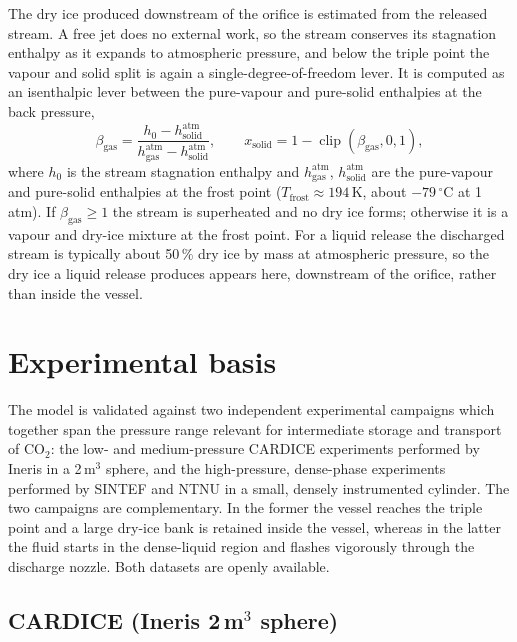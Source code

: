 \documentclass[5p,authoryear]{elsarticle}
\begin{document}
The dry ice produced downstream of the orifice is estimated from the released stream. A free jet
does no external work, so the stream conserves its stagnation enthalpy as it expands to atmospheric
pressure, and below the triple point the vapour and solid split is again a single-degree-of-freedom
lever. It is computed as an isenthalpic lever between the pure-vapour and pure-solid enthalpies at
the back pressure,
\begin{equation}
\label{eq:atmlever}
\beta_\text{gas} = \frac{h_0 - h_\text{solid}^\text{atm}}{h_\text{gas}^\text{atm} - h_\text{solid}^\text{atm}},
\qquad
x_\text{solid} = 1 - \operatorname{clip}(\beta_\text{gas}, 0, 1),
\end{equation}
where $h_0$ is the stream stagnation enthalpy and $h_\text{gas}^\text{atm}$,
$h_\text{solid}^\text{atm}$ are the pure-vapour and pure-solid enthalpies at the frost point
($T_\text{frost} \approx 194$\,K, about $-79\,^\circ$C at 1\,atm). If $\beta_\text{gas} \ge 1$ the
stream is superheated and no dry ice forms; otherwise it is a vapour and dry-ice mixture at the
frost point. For a liquid release the discharged stream is typically about 50\,\% dry ice by mass
at atmospheric pressure, so the dry ice a liquid release produces appears here, downstream of the
orifice, rather than inside the vessel.

\section{Experimental basis}
\label{sec:experimental}

The model is validated against two independent experimental campaigns which together span the
pressure range relevant for intermediate storage and transport of CO$_2$: the low- and
medium-pressure CARDICE experiments performed by Ineris in a 2\,m$^3$ sphere, and the
high-pressure, dense-phase experiments performed by SINTEF and NTNU in a small, densely
instrumented cylinder. The two campaigns are complementary. In the former the vessel reaches
the triple point and a large dry-ice bank is retained inside the vessel, whereas in the latter
the fluid starts in the dense-liquid region and flashes vigorously through the discharge nozzle.
Both datasets are openly available.

\subsection{CARDICE (Ineris \texorpdfstring{2\,m$^3$}{2 m3} sphere)}
\label{sec:exp-cardice}
\end{document}

